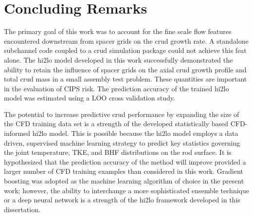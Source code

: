
\section{Concluding Remarks}

The primary goal of this work was to account for the fine scale flow features encountered downstream from spacer grids on the crud growth rate.  A standalone subchannel code coupled to a crud simulation package could not achieve this feat alone.  The hi2lo model developed in this work successfully demonstrated the ability to retain the influence of spacer grids on the axial crud growth profile and total crud mass in a small assembly test problem.  These quantities are important in the evaluation of CIPS risk. The prediction accuracy of the trained hi2lo model was estimated using a LOO cross validation study.

The potential to increase predictive crud performance by expanding the size of the CFD training data set is a strength of the developed statistically based CFD-informed hi2lo model.  This is possible because the hi2lo model employs a data driven, supervised machine learning strategy to predict key statistics governing the joint temperature, TKE, and BHF distributions on the rod surface.   It is hypothesized that the prediction accuracy of the method will improve provided a larger number of CFD training examples than considered in this work.   Gradient boosting was adopted as the machine learning algorithm of choice in the present work; however, the ability to interchange a more sophisticated ensemble technique or a deep neural network is a strength of the hi2lo framework developed in this dissertation.

